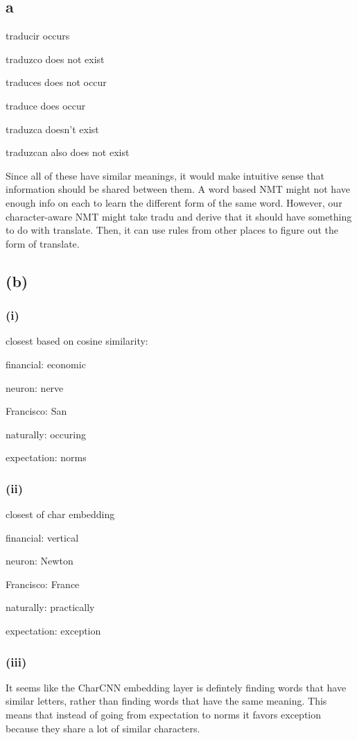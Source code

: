 \documentclass{article}
\begin{document}
\subsection*{a}
traducir occurs

traduzco does not exist

traduces does not occur

traduce does occur

traduzca doesn't exist

traduzcan also does not exist

Since all of these have similar meanings, it would make intuitive sense that information should be shared between them. A word based NMT might not have enough info on each to learn the different form of the same word. However, our character-aware NMT might take tradu and derive that it should have something to do with translate. Then, it can use rules from other places to figure out the form of translate.

\subsection*{(b)}

\subsubsection*{(i)}
closest based on cosine similarity:

financial: economic

neuron: nerve

Francisco: San

naturally: occuring

expectation: norms

\subsubsection*{(ii)}
closest of char embedding

financial: vertical

neuron: Newton

Francisco: France

naturally: practically

expectation: exception

\subsubsection*{(iii)}
It seems like the CharCNN embedding layer is defintely finding words that have similar letters, rather than finding words that have the same meaning. This means that instead of going from expectation to norms it favors exception because they share a lot of similar characters.
\end{document}
